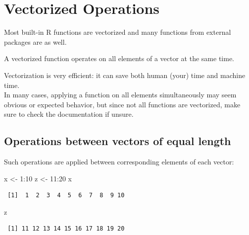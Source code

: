 \documentclass[
]{book}
\makeatletter
\newenvironment{Shaded}{\begin{snugshade}}{\end{snugshade}}
\newcommand{\DecValTok}[1]{\textcolor[rgb]{0.00,0.00,0.81}{#1}}
\newcommand{\NormalTok}[1]{#1}
\newcommand{\OtherTok}[1]{\textcolor[rgb]{0.56,0.35,0.01}{#1}}
\newcommand{\SpecialCharTok}[1]{\textcolor[rgb]{0.00,0.00,0.00}{#1}}
\newenvironment{kframe}{%
\medskip{}
\setlength{\fboxsep}{.8em}
 \def\at@end@of@kframe{}%
 \ifinner\ifhmode%
  \def\at@end@of@kframe{\end{minipage}}%
  \begin{minipage}{\columnwidth}%
 \fi\fi%
 \def\FrameCommand##1{\hskip\@totalleftmargin \hskip-\fboxsep
 \colorbox{shadecolor}{##1}\hskip-\fboxsep
     \hskip-\linewidth \hskip-\@totalleftmargin \hskip\columnwidth}%
 \MakeFramed {\advance\hsize-\width
   \@totalleftmargin\z@ \linewidth\hsize
   \@setminipage}}%
 {\par\unskip\endMakeFramed%
 \at@end@of@kframe}
\newenvironment{rmdblock}[1]
  {
  \begin{itemize}
  \renewcommand{\labelitemi}{
    \raisebox{-.7\height}[0pt][0pt]{
      {\setkeys{Gin}{width=3em,keepaspectratio}\texttt{[image: images/\#1]}}
    }
  }
  \setlength{\fboxsep}{1em}
  \begin{kframe}
  \item
  }
  {
  \end{kframe}
  \end{itemize}
  }
\newenvironment{info}
  {\begin{rmdblock}{info}}
  {\end{rmdblock}}
\makeatother
\begin{document}
\hypertarget{vectorization}{%
\chapter{Vectorized Operations}\label{vectorization}}

Most built-in R functions are vectorized and many functions from external packages are as well.

\begin{info}
A vectorized function operates on all elements of a vector at the same
time.
\end{info}

Vectorization is very efficient: it can save both human (your) time and machine time.\\
In many cases, applying a function on all elements simultaneously may seem obvious or expected behavior, but since not all functions are vectorized, make sure to check the documentation if unsure.

\hypertarget{operations-between-vectors-of-equal-length}{%
\section{Operations between vectors of equal length}\label{operations-between-vectors-of-equal-length}}

Such operations are applied between corresponding elements of each vector:

\begin{Shaded}
\begin{Highlighting}[]
\NormalTok{x }\OtherTok{\textless{}{-}} \DecValTok{1}\SpecialCharTok{:}\DecValTok{10}
\NormalTok{z }\OtherTok{\textless{}{-}} \DecValTok{11}\SpecialCharTok{:}\DecValTok{20}
\NormalTok{x}
\end{Highlighting}
\end{Shaded}

\begin{verbatim}
 [1]  1  2  3  4  5  6  7  8  9 10
\end{verbatim}

\begin{Shaded}
\begin{Highlighting}[]
\NormalTok{z}
\end{Highlighting}
\end{Shaded}

\begin{verbatim}
 [1] 11 12 13 14 15 16 17 18 19 20
\end{verbatim}
\end{document}
